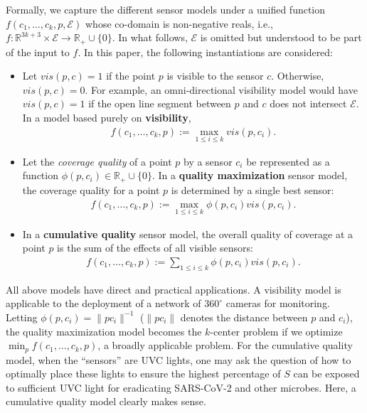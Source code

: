 Formally, we capture the different sensor models under a unified function $f(c_1, \ldots, c_k, p, \mathcal E)$ whose co-domain is non-negative reals, i.e., $f: \mathbb R^{3k + 3} \times \mathcal E \to \mathbb R_+\cup\{0\}$. In what follows, $\mathcal E$ is omitted but understood to be part of the input to $f$. In this paper, the following instantiations are considered:
\begin{itemize}[leftmargin=4mm]
    \item Let $vis(p, c) = 1$ if the point $p$ is visible to the sensor $c$. Otherwise, $vis(p, c) = 0$. For example, an omni-directional visibility model would have $vis(p, c) = 1$ if the open line segment between $p$ and $c$ does not intersect $\mathcal E$. In a model based purely on \textbf{visibility},  
    \begin{align}
    f(c_1, \ldots, c_k, p) := \max_{1\le i \le k}vis(p, c_i).\label{f:1}
    \end{align}
    \item Let the \emph{coverage quality} of a point $p$ by a sensor $c_i$ be represented as a function $\phi(p, c_i) \in \mathbb R_+\cup\{0\}$. In a \textbf{quality maximization} sensor model,  the coverage quality for a point $p$ is determined by a single best sensor:  
    \begin{align}f(c_1, \ldots, c_k, p) := \max_{1\le i \le k} \phi(p, c_i)vis(p, c_i).\label{f:2}
    \end{align}
    \item In a \textbf{cumulative quality} sensor model, the overall quality of coverage at a point $p$ is the sum of the effects of all visible sensors:
    \begin{align}f(c_1, \ldots, c_k, p) := \sum_{1\le i \le k}\phi(p, c_i)vis(p, c_i).\label{f:3}
    \end{align}
\end{itemize}



All above models have direct and practical applications. 
A visibility model is applicable to the deployment of a network of $360^{\circ}$ cameras for monitoring. 
Letting $\phi(p, c_i) = \lVert pc_i\rVert^{-1}$ ($\lVert pc_i\rVert$ denotes the distance between $p$ and $c_i$), 
the quality maximization model becomes the $k$-center problem \cite{weber1929theory} if we optimize $\min_p f(c_1, \ldots, c_k, p)$, 
a broadly applicable problem. For the cumulative quality model, when the ``sensors'' are UVC lights, 
one may ask the question of how to optimally place these lights to ensure the highest percentage of $S$ can be exposed to sufficient UVC light for eradicating SARS-CoV-2 and other microbes. 
Here, a cumulative quality model clearly makes sense. 

